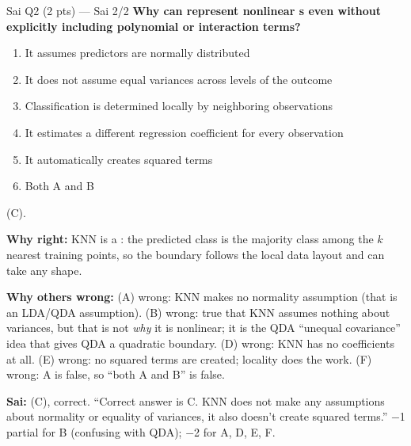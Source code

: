 \begin{qbox}{Sai Q2 (2 pts) --- Sai 2/2}
\textbf{Why can  represent nonlinear s even without explicitly including polynomial or interaction terms?}
\begin{enumerate}[label=(\Alph*),leftmargin=1.6em,itemsep=0pt]
\item It assumes predictors are normally distributed
\item It does not assume equal variances across levels of the outcome
\item Classification is determined locally by neighboring observations
\item It estimates a different regression coefficient for every observation
\item It automatically creates squared terms
\item Both A and B
\end{enumerate}
\ans (C).
\par\textbf{Why right:} KNN is a : the predicted class is the majority class among the $k$ nearest training points, so the boundary follows the local data layout and can take any shape. 
\par\textbf{Why others wrong:}
(A) wrong: KNN makes no normality assumption (that is an LDA/QDA assumption).
(B) wrong: true that KNN assumes nothing about variances, but that is not \emph{why} it is nonlinear; it is the QDA ``unequal covariance'' idea that gives QDA a quadratic boundary.
(D) wrong: KNN has no coefficients at all.
(E) wrong: no squared terms are created; locality does the work.
(F) wrong: A is false, so ``both A and B'' is false.
\par\textbf{\color{dblue}Sai:} (C), correct. \grader ``Correct answer is C. KNN does not make any assumptions about normality or equality of variances, it also doesn't create squared terms.'' $-$1 partial for B (confusing with QDA); $-$2 for A, D, E, F.
\end{qbox}


